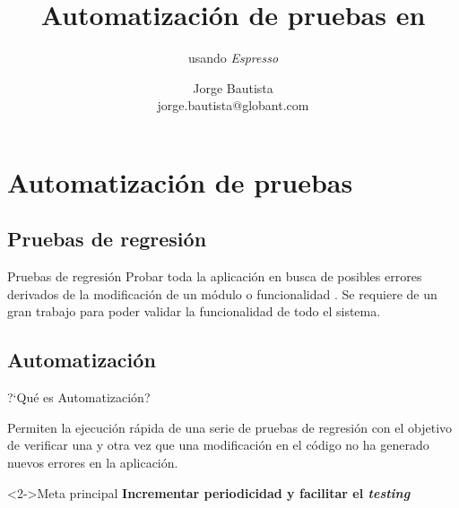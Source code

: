 \documentclass[pdf]
{beamer}
\title{Automatizaci\'on de pruebas en \android{}}
\subtitle{usando \textit{Espresso}}
\author{Jorge Bautista\\jorge.bautista@globant.com}
\begin{document}
     
    \begin{frame}
        \titlepage
    \end{frame}


    \section{Automatizaci\'on de pruebas}


        \subsection{Pruebas de regresi\'on}
        \begin{frame}{Pruebas de regresi\'on}
	  Probar toda la aplicaci\'on en busca de posibles errores derivados de la modificaci\'on de un m\'odulo o funcionalidad . Se requiere de un gran trabajo para poder validar la funcionalidad de todo el sistema.
        \end{frame}
        
        \subsection{Automatizaci\'on}
        \begin{frame}{?`Qu\'e es Automatizaci\'on?}

	      Permiten la ejecuci\'on r\'apida de una serie de pruebas de regresi\'on con el objetivo de verificar una y otra vez que una modificaci\'on en el c\'odigo no ha generado nuevos errores en la aplicaci\'on.
	      
	      \begin{block}<2->{Meta principal}
		\textbf{Incrementar periodicidad y facilitar el \textit{testing}} 
	      \end{block}

        \end{frame}
        
\end{document}
